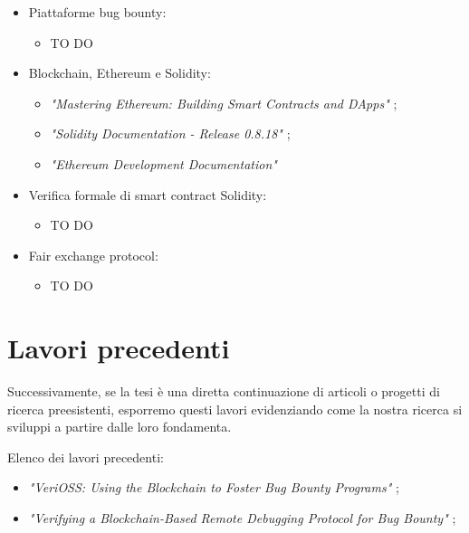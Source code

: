 \begin{itemize}

\item Piattaforme bug bounty:
\begin{itemize}
\item TO DO
\end{itemize}

\item Blockchain, Ethereum e Solidity:
\begin{itemize}

\item \textit{"Mastering Ethereum: Building Smart Contracts and DApps"} \cite{antonopoulos2018mastering};

\item \textit{"Solidity Documentation - Release 0.8.18"} \cite{solidity0.8.18doc};

\item \textit{"Ethereum Development Documentation"} \cite{ethereum2024doc}

\end{itemize}

\item Verifica formale di smart contract Solidity:
\begin{itemize}
\item TO DO
\end{itemize}

\item Fair exchange protocol:
\begin{itemize}
\item TO DO
\end{itemize}

\end{itemize}


\section{Lavori precedenti}

Successivamente, se la tesi è una diretta continuazione di articoli o progetti di ricerca preesistenti, esporremo questi lavori evidenziando come la nostra ricerca si sviluppi a partire dalle loro fondamenta.

\medskip

Elenco dei lavori precedenti:

\begin{itemize}

\item \textit{"VeriOSS: Using the Blockchain to Foster Bug Bounty Programs"} \cite{canidio2021verioss};

\item \textit{"Verifying a Blockchain-Based Remote Debugging Protocol for Bug Bounty"} \cite{degano2021verioss};

\end{itemize}


